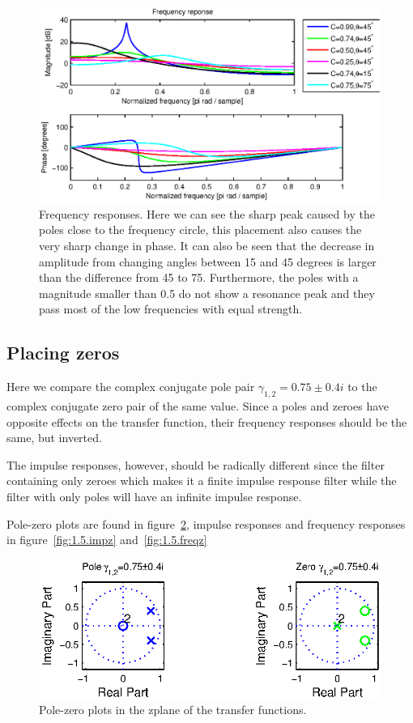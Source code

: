 \begin{figure}
	\center
	\includegraphics{./picture/ha6_1_4_freqz.eps}
	\caption{Frequency responses. Here we can see the sharp peak caused by the poles close to the frequency circle, this placement also causes the very sharp change in phase. It can also be seen that the decrease in amplitude from changing angles between 15 and 45 degrees is larger than the difference from 45 to 75. Furthermore, the poles with a magnitude smaller than 0.5 do not show a resonance peak and they pass most of the low frequencies with equal strength.}
	\label{fig:1.4.freqz}
\end{figure}

\subsection{Placing zeros}
Here we compare the complex conjugate pole pair \(\gamma_{1,2}=0.75\pm0.4i\) to the complex conjugate zero pair of the same value. 
Since a poles and zeroes have opposite effects on the transfer function, their frequency responses should be the same, but inverted.

The impulse responses, however, should be radically different since the filter containing only zeroes which makes it a finite impulse response filter while the filter with only poles will have an infinite impulse response.

Pole-zero plots are found in figure~\ref{fig:1.5.zplane}, impulse responses and frequency responses in figure~\ref{fig:1.5.impz} and~\ref{fig:1.5.freqz}

\begin{figure}
	\center
	\includegraphics{./picture/ha6_1_5_zplane.eps}
	\caption{Pole-zero plots in the zplane of the transfer functions.}
	\label{fig:1.5.zplane}
\end{figure}

